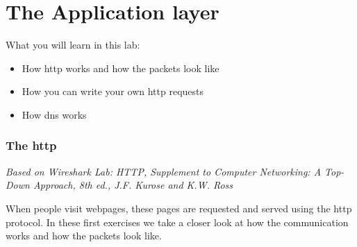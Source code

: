 
\setcounter{chapter}{0}
\chapter{The Application layer}

What you will learn in this lab:
\begin{itemize}
	\item How \acs{http} works and how the packets look like
	\item How you can write your own \acs{http} requests
	\item How \acs{dns} works
\end{itemize}

\newpage
\subsection{The \ac{http}}
\emph{Based on Wireshark Lab: HTTP, Supplement to Computer Networking: A Top-Down Approach, 8th ed., J.F. Kurose and K.W. Ross}

When people visit webpages, these pages are requested and served using the \ac{http} protocol. In these first exercises we take a closer look at how the communication works and how the packets look like.


